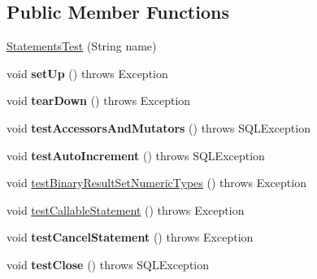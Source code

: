\subsection*{Public Member Functions}
\begin{DoxyCompactItemize}
\item 
\mbox{\hyperlink{classtestsuite_1_1simple_1_1_statements_test_a7cfee1c515cf25d0fa2f99e45a10c76b}{Statements\+Test}} (String name)
\item 
\mbox{\label{classtestsuite_1_1simple_1_1_statements_test_a49ab77bad20dc259d9978a4f3566f2ae}} 
void {\bfseries set\+Up} ()  throws Exception 
\item 
\mbox{\label{classtestsuite_1_1simple_1_1_statements_test_a99769a3bf4c9af2e19ac153633177043}} 
void {\bfseries tear\+Down} ()  throws Exception 
\item 
\mbox{\label{classtestsuite_1_1simple_1_1_statements_test_a14f251093874f75fcc06d42b53c2fb1f}} 
void {\bfseries test\+Accessors\+And\+Mutators} ()  throws S\+Q\+L\+Exception 
\item 
\mbox{\label{classtestsuite_1_1simple_1_1_statements_test_abf02e6d8b359939dafd7b1712e07be01}} 
void {\bfseries test\+Auto\+Increment} ()  throws S\+Q\+L\+Exception 
\item 
void \mbox{\hyperlink{classtestsuite_1_1simple_1_1_statements_test_a8686a9137f5901a701020342f04dc3a7}{test\+Binary\+Result\+Set\+Numeric\+Types}} ()  throws Exception 
\item 
void \mbox{\hyperlink{classtestsuite_1_1simple_1_1_statements_test_a575857630ae7ba0e8a97025a9d5d772f}{test\+Callable\+Statement}} ()  throws Exception 
\item 
\mbox{\label{classtestsuite_1_1simple_1_1_statements_test_ae2be6d16cd76947ee5d58d3215b3e823}} 
void {\bfseries test\+Cancel\+Statement} ()  throws Exception 
\item 
\mbox{\label{classtestsuite_1_1simple_1_1_statements_test_adf288077f570b0f532bdfedd6d04403d}} 
void {\bfseries test\+Close} ()  throws S\+Q\+L\+Exception 

\end{DoxyCompactItemize}
